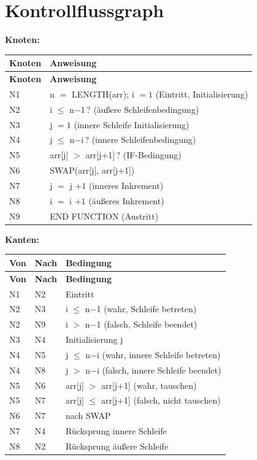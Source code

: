 \documentclass[
	fontsize=12pt,          %
	paper=a4,               %
	numbers=noenddot,       %
	listof=totoc,           %
	listof=entryprefix,     %
	listof=nochaptergap,    %
	bibliography=totoc,     %
	parskip=half,           %
	openany                 %
]{scrbook}
\begin{document}
\section*{Kontrollflussgraph}

\textbf{Knoten:}

\begin{longtable}{| p{1.2cm} | p{10.5cm} |}
	\hline
	\textbf{Knoten} & \textbf{Anweisung} \\ \hline
	\endfirsthead
	\hline
	\textbf{Knoten} & \textbf{Anweisung} \\ \hline
	\endhead
	\hline
	\endfoot
	N1 & n $=$ LENGTH(arr); i $= 1$ (Eintritt, Initialisierung) \\ \hline
	N2 & i $\leq$ n$-$1\,? (äußere Schleifenbedingung) \\ \hline
	N3 & j $= 1$ (innere Schleife Initialisierung) \\ \hline
	N4 & j $\leq$ n$-$i\,? (innere Schleifenbedingung) \\ \hline
	N5 & arr[j] $>$ arr[j$+$1]\,? (IF-Bedingung) \\ \hline
	N6 & SWAP(arr[j], arr[j$+$1]) \\ \hline
	N7 & j $=$ j $+ 1$ (inneres Inkrement) \\ \hline
	N8 & i $=$ i $+ 1$ (äußeres Inkrement) \\ \hline
	N9 & END FUNCTION (Austritt) \\ \hline
\end{longtable}

\textbf{Kanten:}

\begin{longtable}{| p{1.5cm} | p{1.5cm} | p{8.5cm} |}
	\hline
	\textbf{Von} & \textbf{Nach} & \textbf{Bedingung} \\ \hline
	\endfirsthead
	\hline
	\textbf{Von} & \textbf{Nach} & \textbf{Bedingung} \\ \hline
	\endhead
	\hline
	\endfoot
	N1 & N2 & Eintritt \\ \hline
	N2 & N3 & i $\leq$ n$-$1 (wahr, Schleife betreten) \\ \hline
	N2 & N9 & i $>$ n$-$1 (falsch, Schleife beendet) \\ \hline
	N3 & N4 & Initialisierung j \\ \hline
	N4 & N5 & j $\leq$ n$-$i (wahr, innere Schleife betreten) \\ \hline
	N4 & N8 & j $>$ n$-$i (falsch, innere Schleife beendet) \\ \hline
	N5 & N6 & arr[j] $>$ arr[j$+$1] (wahr, tauschen) \\ \hline
	N5 & N7 & arr[j] $\leq$ arr[j$+$1] (falsch, nicht tauschen) \\ \hline
	N6 & N7 & nach SWAP \\ \hline
	N7 & N4 & Rücksprung innere Schleife \\ \hline
	N8 & N2 & Rücksprung äußere Schleife \\ \hline
\end{longtable}
\end{document}
